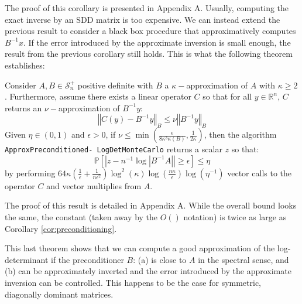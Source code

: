 The proof of this corollary is presented in Appendix A. Usually, computing
the exact inverse by an SDD matrix is too expensive. We can instead
extend the previous result to consider a black box procedure that
approximatively computes $B^{-1}x$. If the error introduced by the
approximate inversion is small enough, the result from the previous
corollary still holds. This is what the following theorem establishes:

\begin{theorem}\label{thm:preconditioning-approx}Consider $A,B\in\mathcal{S}_{n}^{+}$
positive definite with $B$ a $\kappa-$approximation of $A$ with
$\kappa\geq2$. Furthermore, assume there exists a linear operator
$C$ so that for all $y\in\mathbb{R}^{n}$, $C$ returns an $\nu-$approximation
of $B^{-1}y$: 
\[
\left\Vert C\left(y\right)-B^{-1}y\right\Vert _{B}\leq\nu\left\Vert B^{-1}y\right\Vert _{B}
\]
Given $\eta\in\left(0,1\right)$ and $\epsilon>0$, if $\nu\leq\min\left(\frac{\epsilon}{8\kappa^{3}\kappa\left(B\right)},\frac{1}{2\kappa}\right)$,
then the algorithm \texttt{ApproxPreconditioned- LogDetMonteCarlo}
returns a scalar $z$ so that: 
\[
\mathbb{P}\left[\left|z-n^{-1}\log\left|B^{-1}A\right|\right|\geq\epsilon\right]\leq\eta
\]
by performing $64\kappa\left(\frac{1}{\epsilon}+\frac{1}{n\epsilon^{2}}\right)\log^{2}\left(\kappa\right)\log\left(\frac{n\kappa}{\epsilon}\right)\log\left(\eta^{-1}\right)$
vector calls to the operator $C$ and vector multiplies from $A$.

\end{theorem}

The proof of this result is detailed in Appendix A. While the overall
bound looks the same, the constant (taken away by the $O\left(\right)$
notation) is twice as large as Corollary \ref{cor:preconditioning}.

This last theorem shows that we can compute a good approximation of
the log-determinant if the preconditioner $B$: (a) is close to $A$
in the spectral sense, and (b) can be approximately inverted and the
error introduced by the approximate inversion can be controlled. This
happens to be the case for symmetric, diagonally dominant matrices.

